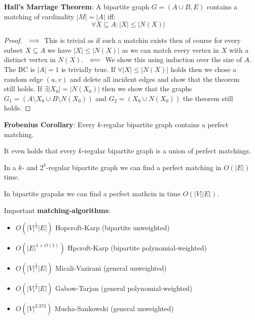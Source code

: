 \begin{theorem}
	\textbf{Hall's Marriage Theorem}: A bipartite graph $G = (A \cup B, E)$ contains a matching of cardinality $|M|=|A|$ iff:
	$$\forall X \subseteq A : |X| \le |N(X)|$$
\end{theorem}

\begin{proof}
	$\\\implies$
	This is trivial as if such a matchin exists then of course for every subset $X \subseteq A$ we have $|X| \le |N(X)|$ as we can  match every vertex in $X$ with a distinct vertex in $N(X)$.
	$\\\impliedby$
	We show this using induction over the size of $A$. The BC is $\mid A \mid = 1$ is trivially true.
	If $\forall |X| \le |N(X)|$ holds then we chose a random edge $(u, v)$  and delete all incident edges and show that the theorem still holds.
	If $\exists |X_0| = |N(X_0)|$ then we show that the graphs $G_1 = (A\setminus X_0 \cup B\setminus N(X_0))$ and $G_2 = (X_0 \cup N(X_0))$ the theorem still holds.
\end{proof}

\begin{theorem}
	\textbf{Frobenius Corollary}: Every $k$-regular bipartite graph contains a perfect matching.
\end{theorem}

\begin{remark}
	It even holds that every $k$-regular bipartite graph is a union of perfect matchings.
\end{remark}

\begin{theorem}
	In a $k$- and $2^k$-regular bipartite graph we can find a perfect matching in $O(|E|)$ time.
\end{theorem}

\begin{theorem}
	In bipartite grapahs we can find a perfect mathcin in time $O(|V| |E|)$.
\end{theorem}

\begin{remark}
	Important \textbf{matching-algorithms}:
	\begin{itemize}
		\item $O({|V|}^{\frac{1}{2}}|E|)$ Hopcroft-Karp (bipartite unweighted)
		\item $O({|E|}^{1+O(1)})$ Hpcroft-Karp (bipartite polynomial-weighted)
		\item $O({|V|}^{\frac{1}{2}}|E|)$ Micali-Vazirani (general unweighted)
		\item $O({|V|}^{\frac{1}{2}}|E|)$ Gabow-Tarjan (general polynomial-weighted)
		\item $O({|V|}^{2.373})$ Mucha-Sankowski (general unweighted)
	\end{itemize}
\end{remark}

